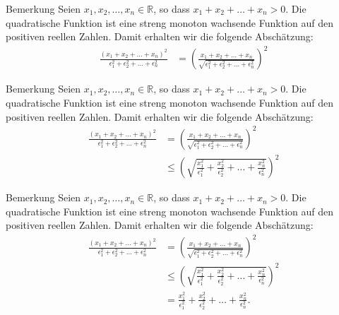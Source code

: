 \documentclass[10pt]{beamer}
\def\bR{\mathbb{R}}
\begin{document}
\begin{frame}{Bemerkung}
    Seien \( x_{1}, x_{2}, \ldots, x_{n} \in \bR \), so dass \( x_{1} + x_{2} + \ldots + x_{n} > 0 \). Die quadratische Funktion ist eine streng monoton wachsende Funktion auf den positiven reellen Zahlen. Damit erhalten wir die folgende Abschätzung:
    \begin{align*}
        \frac{\left( x_{1} + x_{2} + \ldots + x_{n} \right)^{2}}{\epsilon_{1}^{2} + \epsilon_{2}^{2} + \ldots + \epsilon_{n}^{2}}
        & = \left( \frac{x_{1} + x_{2} + \ldots + x_{n}}{\sqrt{\epsilon_{1}^{2} + \epsilon_{2}^{2} + \ldots + \epsilon_{n}^{2}}} \right)^{2}
    \end{align*}
\end{frame}



\begin{frame}{Bemerkung}
    Seien \( x_{1}, x_{2}, \ldots, x_{n} \in \bR \), so dass \( x_{1} + x_{2} + \ldots + x_{n} > 0 \). Die quadratische Funktion ist eine streng monoton wachsende Funktion auf den positiven reellen Zahlen. Damit erhalten wir die folgende Abschätzung:
    \begin{align*}
        \frac{\left( x_{1} + x_{2} + \ldots + x_{n} \right)^{2}}{\epsilon_{1}^{2} + \epsilon_{2}^{2} + \ldots + \epsilon_{n}^{2}}
        & = \left( \frac{x_{1} + x_{2} + \ldots + x_{n}}{\sqrt{\epsilon_{1}^{2} + \epsilon_{2}^{2} + \ldots + \epsilon_{n}^{2}}} \right)^{2} \\
        & \leq \left( \sqrt{\frac{x_{1}^{2}}{\epsilon_{1}^{2}} + \frac{x_{2}^{2}}{\epsilon_{2}^{2}} + \ldots + \frac{x_{n}^{2}}{\epsilon_{n}^{2}}} \right)^{2}
    \end{align*}
\end{frame}



\begin{frame}{Bemerkung}
    Seien \( x_{1}, x_{2}, \ldots, x_{n} \in \bR \), so dass \( x_{1} + x_{2} + \ldots + x_{n} > 0 \). Die quadratische Funktion ist eine streng monoton wachsende Funktion auf den positiven reellen Zahlen. Damit erhalten wir die folgende Abschätzung:
    \begin{align*}
        \frac{\left( x_{1} + x_{2} + \ldots + x_{n} \right)^{2}}{\epsilon_{1}^{2} + \epsilon_{2}^{2} + \ldots + \epsilon_{n}^{2}}
        & = \left( \frac{x_{1} + x_{2} + \ldots + x_{n}}{\sqrt{\epsilon_{1}^{2} + \epsilon_{2}^{2} + \ldots + \epsilon_{n}^{2}}} \right)^{2} \\
        & \leq \left( \sqrt{\frac{x_{1}^{2}}{\epsilon_{1}^{2}} + \frac{x_{2}^{2}}{\epsilon_{2}^{2}} + \ldots + \frac{x_{n}^{2}}{\epsilon_{n}^{2}}} \right)^{2} \\
        & = \frac{x_{1}^{2}}{\epsilon_{1}^{2}} + \frac{x_{2}^{2}}{\epsilon_{2}^{2}} + \ldots + \frac{x_{n}^{2}}{\epsilon_{n}^{2}}.
    \end{align*}
\end{frame}
\end{document}

